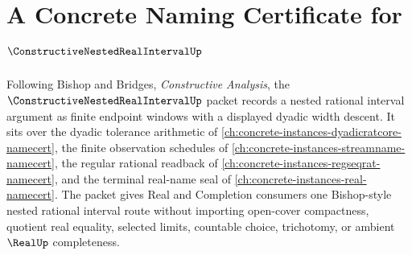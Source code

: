 \chapter{A Concrete Naming Certificate for $\ConstructiveNestedRealIntervalUp$}
\label{ch:concrete-instances-constructive-nested-real-interval-namecert}

Following Bishop and Bridges, \emph{Constructive Analysis}, the $\ConstructiveNestedRealIntervalUp$ packet records a nested rational interval argument as finite endpoint windows with a displayed dyadic width descent. It sits over the dyadic tolerance arithmetic of \autoref{ch:concrete-instances-dyadicratcore-namecert}, the finite observation schedules of \autoref{ch:concrete-instances-streamname-namecert}, the regular rational readback of \autoref{ch:concrete-instances-regseqrat-namecert}, and the terminal real-name seal of \autoref{ch:concrete-instances-real-namecert}. The packet gives Real and Completion consumers one Bishop-style nested rational interval route without importing open-cover compactness, quotient real equality, selected limits, countable choice, trichotomy, or ambient $\RealUp$ completeness.

